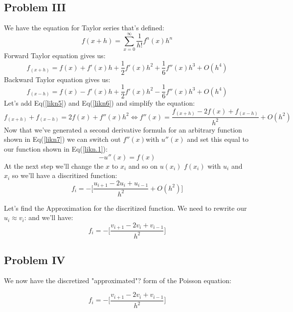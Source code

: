\documentclass{article}
\begin{document}
\subsection*{Problem III}
We have the equation for Taylor series that's defined:
\begin{equation}\label{likn4}
    f{(x+h)} = \sum_{x=0}^{\infty} \frac{1}{h!}f^{n}(x)h^{n}
\end{equation}
Forward Taylor equation gives us:
\begin{equation}\label{likn5}
    f_{(x+h)}= f(x) +f'(x)h + \frac{1}{2}f'(x)h^{2}+\frac{1}{6}f''(x)h^{3}+O(h^{4})
\end{equation}
Backward Taylor equation gives us:
\begin{equation}\label{likn6}
    f_{(x-h)}= f(x) -f'(x)h + \frac{1}{2}f'(x)h^{2}-\frac{1}{6}f''(x)h^{3}+O(h^{4})
\end{equation}
Let's add Eq(\ref{likn5})
and Eq(\ref{likn6}) and simplify the equation:
\begin{equation}\label{likn7}
    f_{(x+h)} + f_{(x-h)} = 2f(x) +f''(x)h^2 \Leftrightarrow  f''(x) = \frac{f_{(x+h)} -2f(x) + f_{(x-h)}}{h^2} + O(h^2)
\end{equation}
Now that we've generated a second derivative formula for an arbitrary function shown in Eq(\ref{likn7}) we can switch out $f''(x) $with $u''(x)$ and set this equal to our function shown in Eq(\ref{likn.1}):
\begin{equation}\label{likn8}
    -u''(x) = f(x)
\end{equation}
At the next step we'll change the $x$ to $x_i$ and so on $u(x_i)$ $f(x_i)$ with $u_i$ and $x_i$ so we'll have a discritized function:
\begin{equation}\label{likn9}
    f_i = -\Big[\frac{u_{i+1} -2u_i + u_{i-1}}{h^2} + O(h^2)\Big]
\end{equation}

Let's find the Approximation for the discritized function.
\vskip 0.01in
We need to rewrite our $u_i \approx v_i$:
and we'll have:
\begin{equation}\label{likn10}
    f_i = -\Big[\frac{v_{i+1} -2v_i + v_{i-1}}{h^2} \Big]
\end{equation}
\subsection*{Problem IV}
We now have the discretized "approximated"? form of the Poisson equation:

\begin{equation}\label{likn11}
    f_i = -\Big[\frac{v_{i+1} -2v_i + v_{i-1}}{h^2} \Big]
\end{equation}
\end{document}
